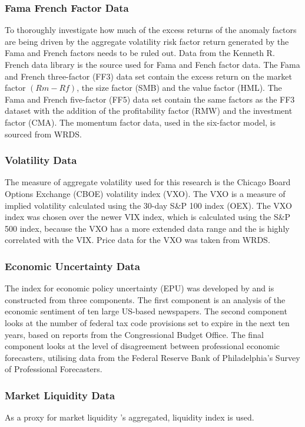 \documentclass[12pt, a4paper, oneside]{article}
\begin{document}
\subsubsection{Fama French Factor Data}
To thoroughly investigate how much of the excess returns of the anomaly factors are being driven by the aggregate volatility risk factor return generated by the Fama and French factors needs to be ruled out. Data from the Kenneth R. French data library is the source used for Fama and Fench factor data. The Fama and French three-factor (FF3) data set contain the excess return on the market factor $(Rm - Rf)$, the size factor (SMB) and the value factor (HML). The Fama and French five-factor (FF5) data set contain the same factors as the FF3 dataset with the addition of the profitability factor (RMW) and the investment factor (CMA). The momentum factor data, used in the six-factor model, is sourced from WRDS.

\subsubsection{Volatility Data}
The measure of aggregate volatility used for this research is the Chicago Board Options Exchange (CBOE) volatility index (VXO). The VXO is a measure of implied volatility calculated using the 30-day S\&P 100 index (OEX). The VXO index was chosen over the newer VIX index, which is calculated using the S\&P 500 index, because the VXO has a more extended data range and the is highly correlated with the VIX. Price data for the VXO was taken from WRDS.

\subsubsection{Economic Uncertainty Data}
The index for economic policy uncertainty (EPU) was developed by  and is constructed from three components. The first component is an analysis of the economic sentiment of ten large US-based newspapers. The second component looks at the number of federal tax code provisions set to expire in the next ten years, based on reports from the Congressional Budget Office. The final component looks at the level of disagreement between professional economic forecasters, utilising data from the Federal Reserve Bank of Philadelphia's Survey of Professional Forecasters.

\subsubsection{Market Liquidity Data}
As a proxy for market liquidity 's aggregated, liquidity index is used. 
\end{document}

